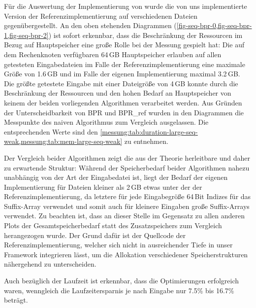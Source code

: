 Für die Auswertung der Implementierung von \bpr wurde die von uns implementierte Version der Referenzimplementierung auf verschiedenen Dateien gegenübergestellt.
An den oben stehenden Diagrammen (\cref{fig-seq-bpr-0,fig-seq-bpr-1,fig-seq-bpr-2}) ist sofort erkennbar, dass die Beschränkung der Ressourcen im Bezug auf Hauptspeicher eine große Rolle bei der Messung gespielt hat:
Die auf dem Rechenknoten verfügbaren 64\,GB Hauptspeicher erlauben auf allen getesteten Eingabedateien im Falle der Referenzimplementierung eine maximale Größe von 1.6\,GB und im Falle der eigenen Implementierung maximal 3.2\,GB.
Die größte getestete Eingabe mit einer Dateigröße von 4\,GB konnte durch die Beschränkung der Ressourcen und den hohen Bedarf an Hauptspeicher von keinem der beiden vorliegenden Algorithmen verarbeitet werden.
Aus Gründen der Unterscheidbarkeit von BPR und BPR\_ref wurden in den Diagrammen die Messpunkte des naiven Algorithmus zum Vergleich ausgelassen.
Die entsprechenden Werte sind den \cref{messung:tab:duration-large-seq-weak,messung:tab:mem-large-seq-weak} zu entnehmen.\par
Der Vergleich beider Algorithmen zeigt die aus der Theorie herleitbare und daher zu erwartende Struktur:
Während der Speicherbedarf beider Algorithmen nahezu unabhängig von der Art der Eingabedatei ist, liegt der Bedarf der eigenen Implementierung für Dateien kleiner als 2\,GB etwas unter der der Referenzimplementierung, da letztere für jede Eingabegröße 64\,Bit Indizes für das Suffix-Array verwendet und somit auch für kleinere Eingaben große Suffix-Arrays verwendet.
Zu beachten ist, dass an dieser Stelle im Gegensatz zu allen anderen Plots der Gesamtspeicherbedarf statt des Zusatzspeichers zum Vergleich herangezogen wurde.
Der Grund dafür ist der Quellcode der Referenzimplementierung, welcher sich nicht in ausreichender Tiefe in unser Framework integrieren lässt, um die Allokation verschiedener Speicherstrukturen nähergehend zu unterscheiden.\par
Auch bezüglich der Laufzeit ist erkennbar, dass die Optimierungen erfolgreich waren, wenngleich die Laufzeitersparnis je nach Eingabe nur 7.5\% bis 16.7\% beträgt.

